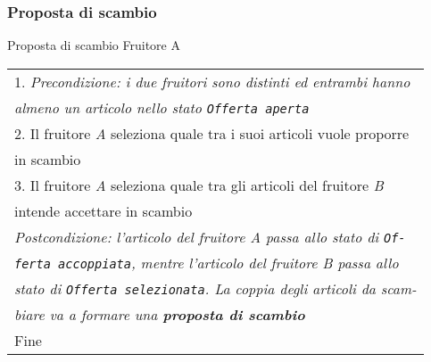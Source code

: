 \begin{minipage}{\textwidth}
    \subsubsection{Proposta di scambio}
    \usecase
        {Proposta di scambio}
        {
            Fruitore A\\
        }
        {
            \begin{tabular}{l}
                1. \textit{Precondizione: i due fruitori sono distinti ed entrambi hanno}\\
                \textit{almeno un articolo nello stato \texttt{Offerta aperta}}\\
                2. Il fruitore \textit{A} seleziona quale tra i suoi articoli vuole proporre\\
                in scambio\\
                3. Il fruitore \textit{A} seleziona quale tra gli articoli del fruitore \textit{B}\\
                intende accettare in scambio\\
                \textit{Postcondizione: l'articolo del fruitore \textit{A} passa allo stato di \texttt{Of-}}\\
                \textit{\texttt{ferta accoppiata}, mentre l'articolo del fruitore \textit{B} passa allo}\\
                \textit{stato di \texttt{Offerta selezionata}. La coppia degli articoli da scam-}\\
                \textit{biare va a formare una \textbf{proposta di scambio}}\\
                Fine
            \end{tabular}\\

        }
        \vspace{0.5cm}
\end{minipage}